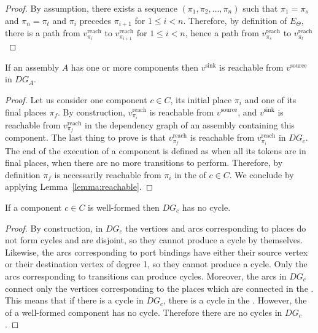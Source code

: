 \begin{proof}
 By assumption, there exists a sequence $(\pi_1, \pi_2, \dots, \pi_n)$
 such that $\pi_1 = \pi_s$ and $\pi_n = \pi_t$ and $\pi_i$ precedes
 $\pi_{i+1}$ for $1 \le i < n$. Therefore, by definition of
 $E_\Theta$, there is a path from $v_{\pi_i}^\text{reach}$ to
 $v_{\pi_{i+1}}^\text{reach}$ for $1 \le i < n$, hence a path from
 $v_{\pi_s}^\text{reach}$ to $v_{\pi_t}^\text{reach}$
\end{proof}


\begin{lemma}
 If an assembly $A$ has one or more components then $v^\text{sink}$ is
 reachable from $v^\text{source}$ in $DG_A$.
 \label{lemma:source_sink}
\end{lemma}

\begin{proof}
 Let us consider one component $c \in C$, its initial place $\pi_i$ and one of
 its final places $\pi_f$. By construction, $v_{\pi_i}^\text{reach}$ is
 reachable from $v^\text{source}$, and $v^\text{sink}$ is reachable from
 $v_{\pi_f}^\text{reach}$ in the dependency graph of an assembly containing this
 component. The last thing to prove is that $v_{\pi_f}^\text{reach}$ is reachable
 from $v_{\pi_i}^\text{reach}$ in $DG_c$.
 The end of the execution of a \mad component is defined as
 when all its tokens are in final places, \ie when there are no more
 transitions to perform. Therefore, by definition $\pi_f$ is
 necessarily reachable from $\pi_i$ in the \net of $c \in C$.
 We conclude by applying Lemma~\ref{lemma:reachable}.
\end{proof}

\begin{lemma}
 If a component $c \in C$ is well-formed then $DG_c$ has no cycle.
 \label{lemma:no_cycles_component}
\end{lemma}

\begin{proof}
 By construction, in $DG_c$ the vertices and arcs corresponding to places do
 not form cycles and are disjoint, so they cannot produce a cycle by themselves.
 Likewise, the arcs corresponding to port bindings have either their source
 vertex or their destination vertex of degree 1, so they cannot produce a cycle.
 Only the arcs corresponding to transitions can produce cycles. Moreover, the
 arcs in $DG_c$ connect only the vertices corresponding to the places which
 are connected in the \net. This means that if there is a cycle in $DG_c$,
 there is a cycle in the \net. However, the \net of a well-formed \mad component
 has no cycle. Therefore there are no cycles in $DG_c$.
\end{proof}


